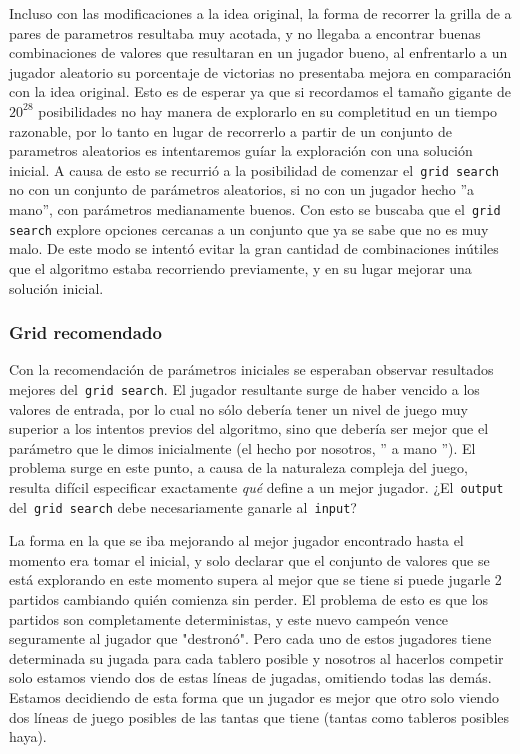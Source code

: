 \documentclass[A4paper,oneside,fleqn,11pt]{article}
\theoremstyle{definition}
\begin{document}
Incluso con las modificaciones a la idea original, la forma de recorrer la grilla de a pares de parametros resultaba muy acotada, y no llegaba a encontrar buenas combinaciones de valores que resultaran en un jugador bueno, al enfrentarlo a un jugador aleatorio su porcentaje de victorias no presentaba mejora en comparación con la idea original. Esto es de esperar ya que si recordamos el tamaño gigante de $ 20^{28}$ posibilidades no hay manera de explorarlo en su completitud en un tiempo razonable, por lo tanto en lugar de recorrerlo a partir de un conjunto de parametros aleatorios es intentaremos guíar la exploración con una solución inicial. A causa de esto se recurrió a la posibilidad de comenzar el\texttt{ grid search} no con un conjunto de parámetros aleatorios, si no con un jugador hecho ''a mano'', con parámetros medianamente buenos. Con esto se buscaba que el\texttt{ grid search} explore opciones cercanas a un conjunto que ya se sabe que no es muy malo. De este modo se intentó evitar la gran cantidad de combinaciones inútiles que el algoritmo estaba recorriendo previamente, y en su lugar mejorar una solución inicial.



\subsubsection{Grid recomendado}


Con la recomendación de parámetros iniciales se esperaban observar resultados mejores del\texttt{ grid search}. El jugador resultante surge de haber vencido a los valores de entrada, por lo cual no sólo debería tener un nivel de juego muy superior a los intentos previos del algoritmo, sino que debería ser mejor que el parámetro que le dimos inicialmente (el hecho por nosotros, '' a mano ''). El problema surge en este punto, a causa de la naturaleza compleja del juego, resulta difícil especificar exactamente \textit{qué} define a un mejor jugador. ¿El\texttt{ output} del\texttt{ grid search} debe necesariamente ganarle al\texttt{ input}? 

La forma en la que se iba mejorando al mejor jugador encontrado hasta el momento era tomar el inicial, y solo declarar que el conjunto de valores que se está explorando en este momento supera al mejor que se tiene si puede jugarle 2 partidos cambiando quién comienza sin perder. El problema de esto es que los partidos son completamente deterministas, y este nuevo campeón vence seguramente al jugador que "destronó". Pero cada uno de estos jugadores tiene determinada su jugada para cada tablero posible y nosotros al hacerlos competir solo estamos viendo dos de estas líneas de jugadas, omitiendo todas las demás. Estamos decidiendo de esta forma que un jugador es mejor que otro solo viendo dos líneas de juego posibles de las tantas que tiene (tantas como tableros posibles haya).
\end{document}
